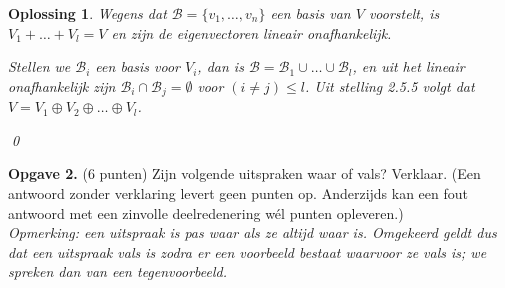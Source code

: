\documentclass[a4paper,12pt]{article}
\newtheorem{oplossing}{Oplossing}
\begin{document}
\begin{enumerate}
\begin{oplossing}
        Wegens dat \(\mathcal{B} = \{v_1, \dots , v_n\}\) een basis van \(V\) voorstelt, is \(V_1 + \dots + V_l = V\) en zijn de eigenvectoren lineair onafhankelijk.

        Stellen we \(\mathcal{B}_i\) een basis voor \(V_i\), dan is \(\mathcal{B} = \mathcal{B}_1 \cup \dots \cup \mathcal{B}_l\),
        en uit het lineair onafhankelijk zijn \(\mathcal{B}_i \cap \mathcal{B}_j = \emptyset\) voor \((i\neq j )\le l\).
        Uit stelling 2.5.5 volgt dat \(V = V_{1}\oplus V_{2}\oplus \dots \oplus V_{l}\).

        \qed
    \end{oplossing}
\end{enumerate}

\vspace{0.5cm}

\textbf{Opgave 2.} (6 punten) Zijn volgende uitspraken waar of vals? Verklaar. (Een antwoord zonder verklaring levert geen punten op. Anderzijds kan een fout antwoord met een zinvolle deelredenering wél punten opleveren.) \\
\textit{Opmerking: een uitspraak is pas waar als ze altijd waar is. Omgekeerd geldt dus dat een uitspraak vals is zodra er een voorbeeld bestaat waarvoor ze vals is; we spreken dan van een tegenvoorbeeld.}
\end{document}
